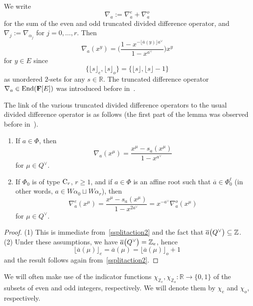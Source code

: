 We write
\begin{equation}\label{Aisum}
\nabla_a:=\nabla_a^e+\nabla_a^o
\end{equation}
for the sum of the even and odd truncated divided difference operator, and $\nabla_j:=\nabla_{\alpha_j}$ for $j=0,\dots,r$. Then
\begin{equation}\label{Aires}
\nabla_a(x^y)=\Biggl(\frac{1-x^{-\lfloor\overline{a}(y)\rfloor a^\vee}}{1-x^{a^\vee}}\Biggr)x^y
\end{equation}
for $y\in E$ since
\begin{equation*}%
\{\lfloor s\rfloor_e,\lfloor s\rfloor_o\}=\{\lfloor s\rfloor,\lfloor s\rfloor-1\}
\end{equation*}
as unordered $2$-sets for any $s\in\mathbb{R}$.
The truncated difference operator $\nabla_a\in\textup{End}(\mathbf{F}[E])$ was introduced before in~\cite[Section~4.2]{SSV2}.

The link of the various truncated divided difference operators to the usual divided difference operator is as follows (the first part of the lemma was observed before in~\cite[Lemma~4.4]{SSV2}).
\begin{Lemma}\label{polredNabla}
\hfill
\begin{enumerate}\itemsep=0pt
\item[$(1)$] If $a\in\Phi$, then
\[
\nabla_a(x^\mu)=\frac{x^\mu-s_a(x^{\mu})}{1-x^{a^\vee}}
\]
for $\mu\in Q^\vee$.
\item[$(2)$] If $\Phi_0$ is of type ${\rm C}_r$, $r\geq 1$, and if $a\in\Phi$ is an affine root such that $\overline{a}\in\Phi_0^\ell$ \textup{(}in other words,
$a\in W\alpha_0\sqcup W\alpha_r$\textup{)},
then
\[
\nabla_a^e(x^\mu)=\frac{x^\mu-s_a(x^{\mu})}{1-x^{2a^\vee}}=x^{-a^\vee}\nabla_a^o(x^\mu)
\]
for $\mu\in Q^\vee$.
\end{enumerate}
\end{Lemma}
\begin{proof}
(1) This is immediate from~\eqref{ssplitaction2} and the fact that $\overline{a}\smash{\bigl(Q^\vee\bigr)}\subseteq\mathbb{Z}$.\\
(2)
Under these assumptions, we have $\overline{a}\smash{\bigl(Q^\vee\bigr)}=\mathbb{Z}_e$, hence
\[
\lfloor \overline{a}(\mu)\rfloor_e=\overline{a}(\mu)=\lfloor \overline{a}(\mu)\rfloor_o+1
\]
and the result follows again from~\eqref{ssplitaction2}.
\end{proof}

We will often make use of the indicator functions $\chi_{\mathbb{Z}_e}, \chi_{\mathbb{Z}_o}\colon \mathbb{R}\rightarrow\{0,1\}$ of the
subsets of even and odd integers, respectively. We will denote them by $\chi_e$ and $\chi_o$, respectively.

